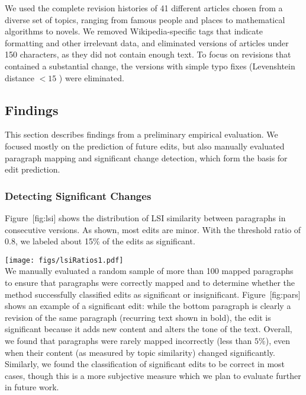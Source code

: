 We used the complete revision histories of 41 different articles chosen
from a diverse set of topics, ranging from famous people and places to
mathematical algorithms to novels. We removed Wikipedia-specific tags
that indicate formatting and other irrelevant data, and eliminated
versions of articles under 150 characters, as they did not contain
enough text. To focus on revisions that contained a substantial change,
the versions with simple typo fixes (Levenshtein distance \(< 15\) )
were eliminated.

\subsection{Findings}\label{findings}

This section describes findings from a preliminary empirical evaluation.
We focused mostly on the prediction of future edits, but also manually
evaluated paragraph mapping and significant change detection, which form
the basis for edit prediction.

\subsubsection{Detecting Significant
Changes}\label{detecting-significant-changes}

Figure~{[}fig:lsi{]} shows the distribution of LSI similarity between
paragraphs in consecutive versions. As shown, most edits are minor. With
the threshold ratio of 0.8, we labeled about 15\% of the edits as
significant.

\texttt{[image: figs/lsiRatios1.pdf]}\\

We manually evaluated a random sample of more than 100 mapped paragraphs
to ensure that paragraphs were correctly mapped and to determine whether
the method successfully classified edits as significant or
insignificant. Figure~{[}fig:pars{]} shows an example of a significant
edit: while the bottom paragraph is clearly a revision of the same
paragraph (recurring text shown in bold), the edit is significant
because it adds new content and alters the tone of the text. Overall, we
found that paragraphs were rarely mapped incorrectly (less than
\(5\%\)), even when their content (as measured by topic similarity)
changed significantly. Similarly, we found the classification of
significant edits to be correct in most cases, though this is a more
subjective measure which we plan to evaluate further in future work.

